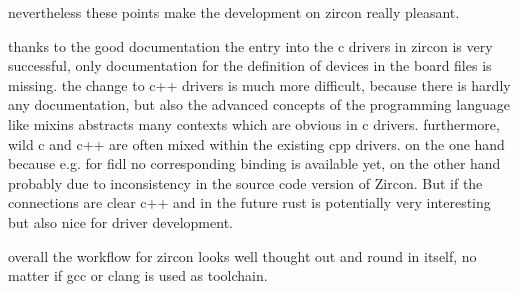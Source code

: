 %
%

nevertheless these points make the development on zircon really pleasant.

thanks to the good documentation the entry into the c drivers in zircon is very successful, only documentation for the definition of devices in the board files is missing.
the change to c++ drivers is much more difficult, because there is hardly any documentation, but also the advanced concepts of the programming language like mixins abstracts many contexts which are obvious in c drivers.
furthermore, wild c and c++ are often mixed within the existing cpp drivers. 
on the one hand because e.g. for fidl no corresponding binding is available yet, on the other hand probably due to inconsistency in the source code version of Zircon.
But if the connections are clear c++ and in the future rust is potentially very interesting but also nice for driver development.

overall the workflow for zircon looks well thought out and round in itself, no matter if gcc or clang is used as toolchain.



